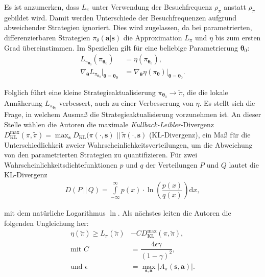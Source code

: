 Es ist anzumerken, dass $L_{\pi}$ unter Verwendung der Besuchfrequenz $\rho_{\pi}$ anstatt  $\rho_{\tilde{\pi}}$ gebildet wird. Damit werden Unterschiede der Besuchfrequenzen aufgrund abweichender Strategien ignoriert. Dies wird zugelassen, da bei parametrierten, differenzierbaren Strategien $\pi_{\theta}(\bm{a}|\bm{s})$ die Approximation $L_{\pi}$ und $\eta$ bis zum ersten Grad übereinstimmen. Im Speziellen gilt für eine beliebige Parametrierung $\bm{\theta}_0$:
\begin{align}
L_{\pi_{\bm{\theta}_0}}(\pi_{\bm{\theta}_0}) &= \eta(\pi_{\bm{\theta}_0}), \nonumber \\
\nabla_{\bm{\theta}} L_{\pi_{\bm{\theta}_0}} \vert_{\bm{\theta=\bm{\theta}_0}} &=
\nabla_{\bm{\theta}} \eta(\pi_{\bm{\theta}})\vert_{\bm{\theta}=\bm{\theta}_0}.
\label{eq:loss_approximation}
\end{align}

Folglich führt eine kleine Strategieaktualisierung $\pi_{\bm{\theta}_0} \rightarrow \tilde{\pi}$, die die lokale Annäherung $L_{\pi_{\bm{\theta}_0}}$ verbessert, auch zu einer Verbesserung von $\eta$. Es stellt sich die Frage, in welchem Ausmaß die Strategieaktualisierung vorzunehmen ist. An dieser Stelle wählen die Autoren die maximale \textit{Kullback-Leibler}-Divergenz  
$D_{\mathrm{KL}}^{\mathrm{max}}(\pi,\tilde{\pi}) = 
\max_{\bm{s}} D_{\mathrm{KL}}(\pi(\cdot, \bm{s})\,\, || \, \tilde{\pi}(\cdot, \bm{s})$ 
(KL-Divergenz), ein Maß für die Unterschiedlichkeit zweier Wahrscheinlichkeitsverteilungen, um die Abweichung von den parametrierten Strategien zu quantifizieren. Für zwei Wahrscheinlichkeitsdichtefunktionen $p$ und $q$ der Verteilungen $P$ und $Q$ lautet die KL-Divergenz 
\begin{align}
D(P\,||\,Q) = \int\limits_{-\infty}^{\infty} p(x)\cdot 
\ln \left( \dfrac{p(x)}{q(x)} \right) \mathrm{d}x,
\label{eq:kl-divergenz}
\end{align}

mit dem natürliche Logarithmus $\ln$. Als nächstes leiten die Autoren die folgenden Ungleichung her:
\begin{align}
\eta(\tilde{\pi}) \geq L_\pi(\tilde{\pi}) &- CD_{\mathrm{KL}}^{\mathrm{max}} (\pi, \tilde{\pi}), \nonumber \\
\text{mit } C &= \dfrac{4\epsilon\gamma}{(1-\gamma)^2}, \nonumber \\
\text{und } \epsilon &= \max\limits_{\bm{s},\bm{a}} | A_\pi(\bm{s},\bm{a}) | .
\label{eq:trpo_theorem}
\end{align}


